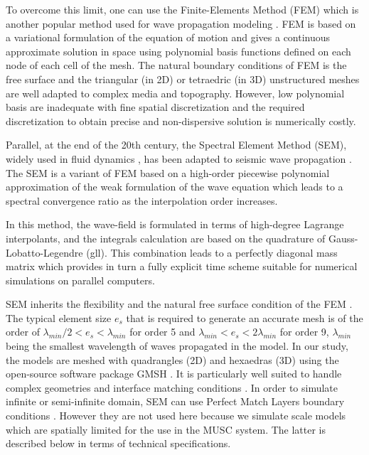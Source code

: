 \documentclass[manuscript,revised]{geophysics}
\begin{document}
\noindent To overcome this limit, one can use the Finite-Elements Method (FEM) which is another popular method used for wave propagation modeling \citep{Lysmer_FEM_1972,Seron_FEM_1990,Hulbert_FEM_1990}. FEM is based on a variational formulation of the equation of motion and gives a continuous approximate solution in space using polynomial basis functions defined on each node of each cell of the mesh. The natural boundary conditions of FEM is the free surface and the triangular (in 2D) or tetraedric (in 3D) unstructured meshes are well adapted to complex media and topography. However, low polynomial basis are inadequate with fine spatial discretization and the required discretization to obtain precise and non-dispersive solution is numerically costly. 

\noindent Parallel, at the end of the 20th century, the Spectral Element Method (SEM), widely used in fluid dynamics \citep{Patera_SEM_1984,Korczak_SEM_1986,Karniadakis_FEM_1989}, has been adapted to seismic wave propagation \citep{Komatitsch_SEM_1998,Komatitsch_ISM_1999,Komatitsch_SEM_2005,Festa_PML_2005}. The SEM is a variant of FEM based on a high-order piecewise polynomial approximation of the weak formulation of the wave equation which leads to a spectral convergence ratio as the interpolation order increases. 

\noindent In this method, the wave-field is formulated in terms of high-degree Lagrange interpolants, and the integrals calculation are based on the quadrature of Gauss-Lobatto-Legendre (gll). This combination leads to a perfectly diagonal mass matrix which provides in turn a fully explicit time scheme suitable for numerical simulations on parallel computers.

\noindent SEM inherits the flexibility and the natural free surface condition of the FEM \citep{Tromp_SEM_2008}. The typical element size $e_{s}$ that is required to generate an accurate mesh is of the order of $\lambda_{min} /2 < e_{s} < \lambda_{min}$ for order 5 and $\lambda_{min} < e_{s} < 2\lambda_{min}$ for order 9, $\lambda_{min}$ being the smallest wavelength of waves propagated in the model. In our study, the models are meshed with quadrangles (2D) and hexaedras (3D) using the open-source software package GMSH \citep{Geuzaine_MSH_2009}. It is particularly well suited to handle complex geometries and interface matching conditions \citep{Cristini_SEM_2012}. In order to simulate infinite or semi-infinite domain, SEM can use Perfect Match Layers boundary conditions \citep{Berenger_PML_1994,Festa_PML_2005}. However they are not used here because we simulate scale models which are spatially limited for the use in the MUSC system. The latter is described below in terms of technical specifications.
\end{document}
